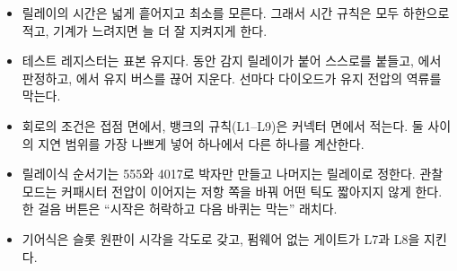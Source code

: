 \begin{itemize}
\item 릴레이의 시간은 넓게 흩어지고 최소를 모른다. 그래서 시간 규칙은 모두 하한으로 적고, 기계가 느려지면 늘
더 잘 지켜지게 한다.
\item 테스트 레지스터는 표본 유지다.  동안 감지 릴레이가 붙어 스스로를 붙들고, 에서
판정하고, 에서 유지 버스를 끊어 지운다. 선마다 다이오드가 유지 전압의 역류를 막는다.
\item 회로의 조건은 접점 면에서, 뱅크의 규칙(L1--L9)은 커넥터 면에서 적는다. 둘 사이의 지연 범위를 가장 나쁘게
넣어 하나에서 다른 하나를 계산한다.
\item 릴레이식 순서기는 555와 4017로 박자만 만들고 나머지는 릴레이로 정한다. 관찰 모드는 커패시터 전압이 이어지는
저항 쪽을 바꿔 어떤 틱도 짧아지지 않게 한다. 한 걸음 버튼은 ``시작은 허락하고 다음 바퀴는 막는'' 래치다.
\item 기어식은 슬롯 원판이 시각을 각도로 갖고, 펌웨어 없는 게이트가 L7과 L8을 지킨다.
\end{itemize}
